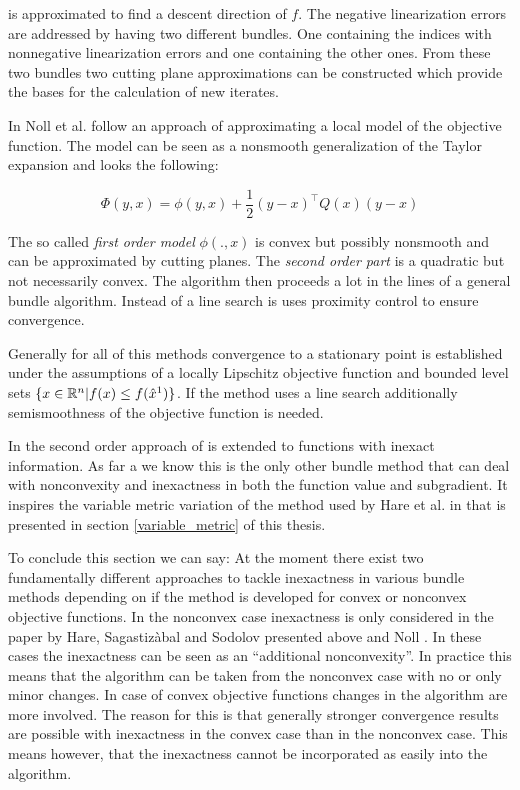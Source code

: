 is approximated to find a descent direction of \(f\).
The negative linearization errors are addressed by having two different bundles. One containing the indices with nonnegative linearization errors and one containing the other ones. From these two bundles two cutting plane approximations can be constructed which provide the bases for the calculation of new iterates.

In \cite{Noll2012} Noll et al. follow an approach of approximating a local model of the objective function. The model can be seen as a nonsmooth generalization of the Taylor expansion and looks the following:

\begin{equation}
	\Phi(y,x) = \phi(y,x)+\frac{1}{2}(y-x)^{\top}Q(x)(y-x)
\label{quad_mod}
\end{equation}

The so called \emph{first order model} \(\phi(.,x)\) is convex but possibly nonsmooth and can be approximated by cutting planes. The \emph{second order part} is a quadratic but not necessarily convex. The algorithm then proceeds a lot in the lines of a general bundle algorithm.
Instead of a line search is uses proximity control to ensure convergence.

Generally for all of this methods convergence to a stationary point is established under the assumptions of a locally Lipschitz objective function and bounded level sets \(\{x \in \mathbb{R}^n | f(x) \leq f(\hat{x}^1)\}\).
If the method uses a line search additionally semismoothness of the objective function is needed.

In \cite{Noll2013} the second order approach of \cite{Noll2012} is extended to functions with inexact information.
As far a we know this is the only other bundle method that can deal with nonconvexity and inexactness in both the function value and subgradient. It inspires the variable metric variation of the method used by Hare et al. in \cite{Hare2016} that is presented in section \ref{variable_metric} of this thesis.

To conclude this section we can say: At the moment there exist two fundamentally different approaches to tackle inexactness in various bundle methods depending on if the method is developed 	for convex or nonconvex objective functions.
In the nonconvex case inexactness is only considered in the paper by Hare, Sagastiz{\`{a}}bal and Sodolov \cite{Hare2016} presented above and Noll \cite{Noll2013}. In these cases the inexactness can be seen as an ``additional nonconvexity''. In practice this means that the algorithm can be taken from the nonconvex case with no or only minor changes.
In case of convex objective functions changes in the algorithm are more involved. The reason for this is that generally stronger convergence results are possible with inexactness in the convex case than in the nonconvex case. This means however, that the inexactness cannot be incorporated as easily into the algorithm.
